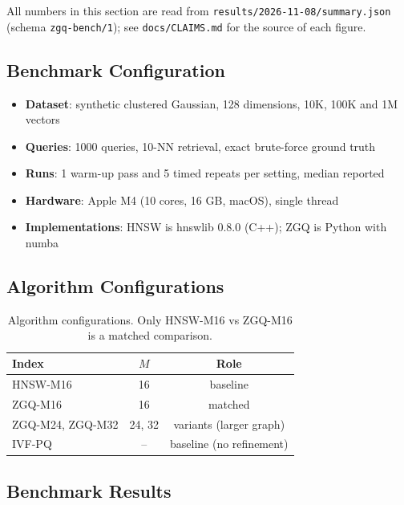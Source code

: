 \documentclass[11pt,a4paper]{article}
\begin{document}
All numbers in this section are read from \texttt{results/2026-11-08/summary.json} (schema \texttt{zgq-bench/1}); see \texttt{docs/CLAIMS.md} for the source of each figure.

\subsection{Benchmark Configuration}

\begin{tcolorbox}[title=Experimental Setup]
\begin{itemize}
    \item \textbf{Dataset}: synthetic clustered Gaussian, 128 dimensions, 10K, 100K and 1M vectors
    \item \textbf{Queries}: 1000 queries, 10-NN retrieval, exact brute-force ground truth
    \item \textbf{Runs}: 1 warm-up pass and 5 timed repeats per setting, median reported
    \item \textbf{Hardware}: Apple M4 (10 cores, 16 GB, macOS), single thread
    \item \textbf{Implementations}: HNSW is hnswlib 0.8.0 (C++); ZGQ is Python with numba
\end{itemize}
\end{tcolorbox}

\subsection{Algorithm Configurations}

\begin{table}[h]
\centering
\caption{Algorithm configurations. Only HNSW-M16 vs ZGQ-M16 is a matched comparison.}
\label{tab:params}
\begin{tabular}{lcc}
\toprule
\textbf{Index} & \textbf{$M$} & \textbf{Role} \\
\midrule
HNSW-M16 & 16 & baseline \\
ZGQ-M16 & 16 & matched \\
ZGQ-M24, ZGQ-M32 & 24, 32 & variants (larger graph) \\
IVF-PQ & -- & baseline (no refinement) \\
\bottomrule
\end{tabular}
\end{table}

\subsection{Benchmark Results}
\end{document}

